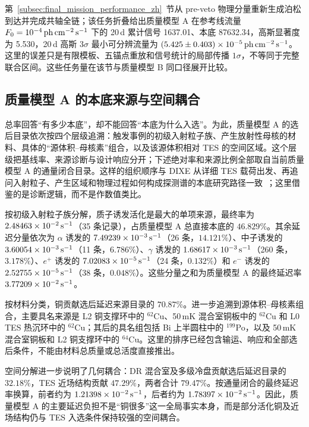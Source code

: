 第~\ref{subsec:final_mission_performance_zh}~节从 pre-veto 物理分量重新生成泊松到达并完成共轴全链；该任务折叠给出质量模型 A 在参考线流量 $F_0=10^{-4}\,\mathrm{ph\,cm^{-2}\,s^{-1}}$ 下的 20\,d 累计信号 1637.01、本底 87632.34，高斯显著度为 5.530，20\,d 高斯 $3\sigma$ 最小可分辨流量为 $(5.425\pm0.403)\times10^{-5}\,\mathrm{ph\,cm^{-2}\,s^{-1}}$。这里的误差只是有限模板、五锚点重放和信号统计的局部传播 $1\sigma$，不等同于完整联合区间。这些任务量在该节与质量模型 B 同口径展开比较。

\subsection{质量模型 A 的本底来源与空间耦合}
\label{subsec:mass_model_a_origins_zh}

总率回答“有多少本底”，却不能回答“本底为什么入选”。为此，质量模型 A 的选后目录依次按四个层级追溯：触发事例的初级入射粒子族、产生放射性母核的材料、具体的“源体积--母核素”组合，以及该源体积相对 TES 的空间区域。这个层级把基线率、来源诊断与设计响应分开；下述绝对率和来源比例全部取自当前质量模型 A 的通量闭合目录。这样的组织顺序与 DIXE 从详细 TES 载荷出发、再追问入射粒子、产生区域和物理过程如何构成探测谱的本底研究路径一致~\cite{Tian2026DIXE}；这里借鉴的是诊断逻辑，而不是作数值类比。

按初级入射粒子族分解，质子诱发活化是最大的单项来源，最终率为 $2.48463\times10^{-2}\,\mathrm{s^{-1}}$（35 条记录），占质量模型 A 总直接本底的 $46.829\%$。其余延迟分量依次为 $\alpha$ 诱发的 $7.49239\times10^{-3}\,\mathrm{s^{-1}}$（26 条，$14.121\%$）、中子诱发的 $3.60054\times10^{-3}\,\mathrm{s^{-1}}$（11 条，$6.786\%$）、$\gamma$ 诱发的 $1.68617\times10^{-3}\,\mathrm{s^{-1}}$（260 条，$3.178\%$）、$e^+$ 诱发的 $7.02083\times10^{-5}\,\mathrm{s^{-1}}$（24 条，$0.132\%$）和 $e^-$ 诱发的 $2.52755\times10^{-5}\,\mathrm{s^{-1}}$（38 条，$0.048\%$）。这些分量之和为质量模型 A 的最终延迟率 $3.77209\times10^{-2}\,\mathrm{s^{-1}}$。

按材料分类，铜贡献选后延迟来源目录的 $70.87\%$。进一步追溯到源体积--母核素组合，主要具名来源是 L2 铜支撑环中的 $^{62}$Cu、50\,mK 混合室铜板中的 $^{62}$Cu 和 L0 TES 热沉环中的 $^{62}$Cu；其后的具名组包括 Bi 上半圆柱中的 $^{199}$Po，以及 50\,mK 混合室铜板和 L2 铜支撑环中的 $^{64}$Cu。这里的排序已经包含输运、响应和全部选后条件，不能由材料总质量或总活度直接推出。

空间分解进一步说明了几何耦合：DR 混合室及多级冷盘贡献选后延迟目录的 $32.18\%$，TES 近场结构贡献 $47.29\%$，两者合计 $79.47\%$。按通量闭合的最终延迟率换算，前者约为 $1.21398\times10^{-2}\,\mathrm{s^{-1}}$，后者约为 $1.78397\times10^{-2}\,\mathrm{s^{-1}}$。因此，质量模型 A 的主要延迟负担不是“铜很多”这一全局事实本身，而是部分活化铜及近场结构仍与 TES 入选条件保持较强的空间耦合。


